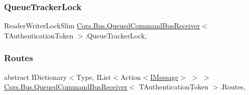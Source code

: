 \subsubsection{\texorpdfstring{Queue\+Tracker\+Lock}{QueueTrackerLock}}
{\footnotesize\ttfamily Reader\+Writer\+Lock\+Slim \hyperlink{classCqrs_1_1Bus_1_1QueuedCommandBusReceiver}{Cqrs.\+Bus.\+Queued\+Command\+Bus\+Receiver}$<$ T\+Authentication\+Token $>$.Queue\+Tracker\+Lock\hspace{0.3cm}{\ttfamily [get]}, {\ttfamily [protected]}}

\mbox{\label{classCqrs_1_1Bus_1_1QueuedCommandBusReceiver_ad69fe38758694599261bad82e6c6378c_ad69fe38758694599261bad82e6c6378c}} 
\subsubsection{\texorpdfstring{Routes}{Routes}}
{\footnotesize\ttfamily abstract I\+Dictionary$<$Type, I\+List$<$Action$<$\hyperlink{interfaceCqrs_1_1Messages_1_1IMessage}{I\+Message}$>$ $>$ $>$ \hyperlink{classCqrs_1_1Bus_1_1QueuedCommandBusReceiver}{Cqrs.\+Bus.\+Queued\+Command\+Bus\+Receiver}$<$ T\+Authentication\+Token $>$.Routes\hspace{0.3cm}{\ttfamily [get]}, {\ttfamily [protected]}}

